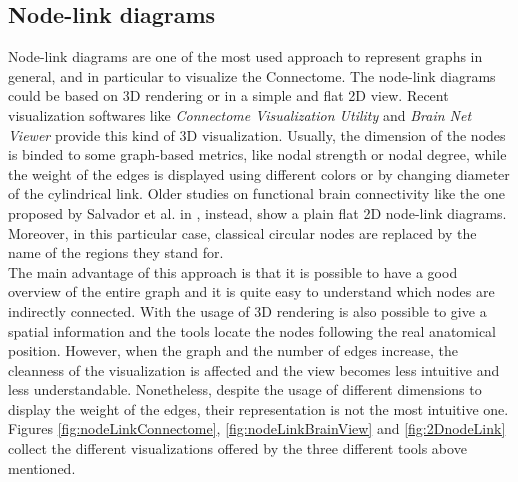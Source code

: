 \documentclass{article}
\begin{document}
\begin{multicols}{2}
\subsection{Node-link diagrams}
Node-link diagrams are one of the most used approach to represent graphs in general, and in particular to visualize the Connectome. The node-link diagrams could be based on 3D rendering or in a simple and flat 2D view. Recent visualization softwares like \textit{Connectome Visualization Utility} \cite{connectomeVisualizationUtility}  and \textit{Brain Net Viewer} \cite{brainNetViewer} provide this kind of 3D visualization. Usually, the dimension of the nodes is binded to some graph-based metrics, like nodal strength or nodal degree, while the weight of the edges is displayed using different colors or by changing diameter of the cylindrical link. Older studies on functional brain connectivity like the one proposed by Salvador et al. in \cite{salvador2005undirected}, instead, show a plain flat 2D node-link diagrams. Moreover, in this particular case, classical circular nodes are replaced by the name of the regions they stand for.\\ The main advantage of this approach is that it is possible to have a good overview of the entire graph and it is quite easy to understand which nodes are indirectly connected. With the usage of 3D rendering is also possible to give a spatial information and the tools locate the nodes following the real anatomical position. However, when the graph and the number of edges increase, the cleanness of the visualization is affected and the view becomes less intuitive and less understandable. Nonetheless, despite the usage of different dimensions to display the weight of the edges, their representation is not the most intuitive one. \\
Figures \ref{fig:nodeLinkConnectome}, \ref{fig:nodeLinkBrainView} and \ref{fig:2DnodeLink} collect the different visualizations offered by the three different tools above mentioned.



\end{multicols}
\end{document}
